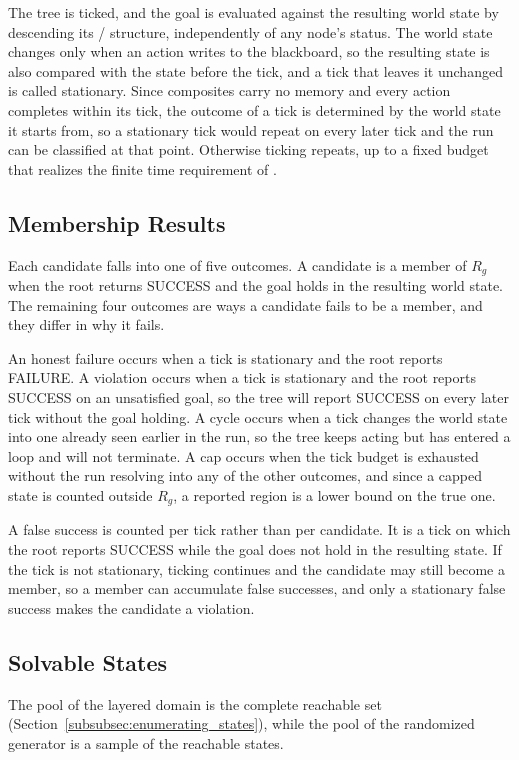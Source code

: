     The tree is ticked, and the goal is evaluated against the resulting world state by descending its / structure, independently of any node's status.
    The world state changes only when an action writes to the blackboard, so the resulting state is also compared with the state before the tick, and a tick that leaves it unchanged is called stationary.
    Since composites carry no memory and every action completes within its tick, the outcome of a tick is determined by the world state it starts from, so a stationary tick would repeat on every later tick and the run can be classified at that point.
    Otherwise ticking repeats, up to a fixed budget that realizes the finite time requirement of \probprime.

    \subsection{Membership Results}
    \label{subsec:membership_outcomes}
    Each candidate falls into one of five outcomes.
    A candidate is a member of $R_g$ when the root returns SUCCESS and the goal holds in the resulting world state.
    The remaining four outcomes are ways a candidate fails to be a member, and they differ in why it fails.

    An honest failure occurs when a tick is stationary and the root reports FAILURE.
    A violation occurs when a tick is stationary and the root reports SUCCESS on an unsatisfied goal, so the tree will report SUCCESS on every later tick without the goal holding.
    A cycle occurs when a tick changes the world state into one already seen earlier in the run, so the tree keeps acting but has entered a loop and will not terminate.
    A cap occurs when the tick budget is exhausted without the run resolving into any of the other outcomes, and since a capped state is counted outside $R_g$, a reported region is a lower bound on the true one.
    
    A false success is counted per tick rather than per candidate.
    It is a tick on which the root reports SUCCESS while the goal does not hold in the resulting state.
    If the tick is not stationary, ticking continues and the candidate may still become a member, so a member can accumulate false successes, and only a stationary false success makes the candidate a violation.

    \subsection{Solvable States}
    \label{sec:membership_pools_reachability}
    \label{sec:membership_set_comparison}
    The pool of the layered domain is the complete reachable set (Section~\ref{subsubsec:enumerating_states}), while the pool of the randomized generator is a sample of the reachable states.

